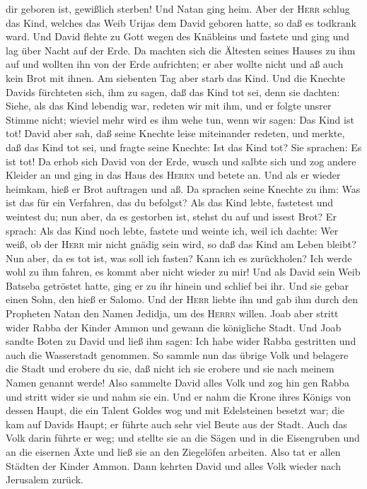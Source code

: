 dir geboren ist, gewißlich sterben!  Und Natan ging heim.
Aber der \textsc{Herr} schlug das Kind, welches das Weib Urijas dem
David geboren hatte, so daß es todkrank ward.  Und David
flehte zu Gott wegen des Knäbleins und fastete und ging und lag über
Nacht auf der Erde.  Da machten sich die Ältesten seines
Hauses zu ihm auf und wollten ihn von der Erde aufrichten; er aber
wollte nicht und aß auch kein Brot mit ihnen.  Am
siebenten Tag aber starb das Kind. Und die Knechte Davids fürchteten
sich, ihm zu sagen, daß das Kind tot sei, denn sie dachten: Siehe, als
das Kind lebendig war, redeten wir mit ihm, und er folgte unsrer Stimme
nicht; wieviel mehr wird es ihm wehe tun, wenn wir sagen: Das Kind ist
tot!  David aber sah, daß seine Knechte leise miteinander
redeten, und merkte, daß das Kind tot sei, und fragte seine Knechte: Ist
das Kind tot? Sie sprachen: Es ist tot!  Da erhob sich
David von der Erde, wusch und salbte sich und zog andere Kleider an und
ging in das Haus des \textsc{Herrn} und betete an. Und als er wieder
heimkam, hieß er Brot auftragen und aß.  Da sprachen
seine Knechte zu ihm: Was ist das für ein Verfahren, das du befolgst?
Als das Kind lebte, fastetest und weintest du; nun aber, da es gestorben
ist, stehst du auf und issest Brot?  Er sprach: Als das
Kind noch lebte, fastete und weinte ich, weil ich dachte: Wer weiß, ob
der \textsc{Herr} mir nicht gnädig sein wird, so daß das Kind am Leben
bleibt?  Nun aber, da es tot ist, was soll ich fasten?
Kann ich es zurückholen? Ich werde wohl zu ihm fahren, es kommt aber
nicht wieder zu mir!  Und als David sein Weib Batseba
getröstet hatte, ging er zu ihr hinein und schlief bei ihr. Und sie
gebar einen Sohn, den hieß er Salomo.  Und der
\textsc{Herr} liebte ihn und gab ihm durch den Propheten Natan den Namen
Jedidja, um des \textsc{Herrn} willen.  Joab aber stritt
wider Rabba der Kinder Ammon und gewann die königliche Stadt.
 Und Joab sandte Boten zu David und ließ ihm sagen: Ich
habe wider Rabba gestritten und auch die Wasserstadt genommen.
 So sammle nun das übrige Volk und belagere die Stadt und
erobere du sie, daß nicht ich sie erobere und sie nach meinem Namen
genannt werde!  Also sammelte David alles Volk und zog
hin gen Rabba und stritt wider sie und nahm sie ein.  Und
er nahm die Krone ihres Königs von dessen Haupt, die ein Talent Goldes
wog und mit Edelsteinen besetzt war; die kam auf Davids Haupt; er führte
auch sehr viel Beute aus der Stadt.  Auch das Volk darin
führte er weg; und stellte sie an die Sägen und in die Eisengruben und
an die eisernen Äxte und ließ sie an den Ziegelöfen arbeiten. Also tat
er allen Städten der Kinder Ammon. Dann kehrten David und alles Volk
wieder nach Jerusalem zurück.

